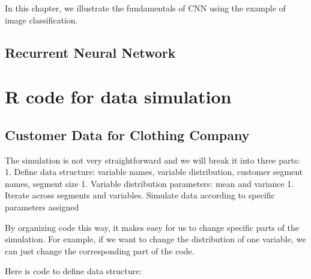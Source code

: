 \documentclass[12pt,]{krantz}
\begin{document}
In this chapter, we illustrate the fundamentals of CNN using the example of image classification.

\hypertarget{recurrent-neural-network}{%
\section{Recurrent Neural Network}\label{recurrent-neural-network}}

\hypertarget{appendix-appendix}{%
\appendix {}}


\hypertarget{r-code-for-data-simulation}{%
\chapter{R code for data simulation}\label{r-code-for-data-simulation}}

\hypertarget{customer-data-for-clothing-company}{%
\section{Customer Data for Clothing Company}\label{customer-data-for-clothing-company}}

The simulation is not very straightforward and we will break it into three parts:
1. Define data structure: variable names, variable distribution, customer segment names, segment size
1. Variable distribution parameters: mean and variance
1. Iterate across segments and variables. Simulate data according to specific parameters assigned

By organizing code this way, it makes easy for us to change specific parts of the simulation. For example, if we want to change the distribution of one variable, we can just change the corresponding part of the code.

Here is code to define data structure:
\end{document}
